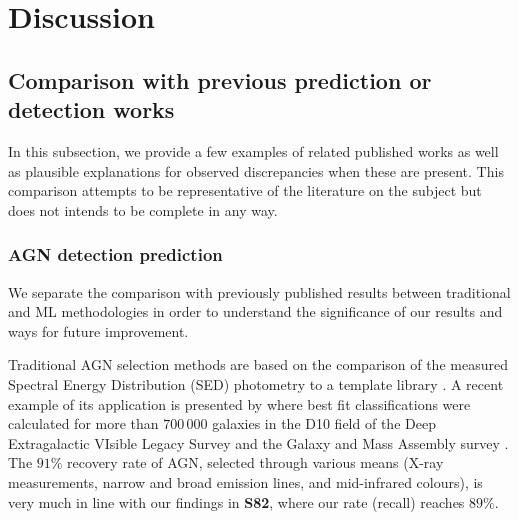 \documentclass{aa}
\begin{document}
\section{Discussion}\label{sec:discussion}


\subsection{Comparison with previous prediction or detection works}\label{sec:compare_previous_works}

In this subsection, we provide a few examples of related published works as well as plausible explanations for observed discrepancies when these are present. This comparison attempts to be representative of the literature on the subject but does not intends to be complete in any way.

\subsubsection{AGN detection prediction}\label{sec:previous_AGN_detection}

We separate the comparison with previously published results between traditional and ML methodologies in order to understand the significance of our results and ways for future improvement.

Traditional AGN selection methods are based on the comparison of the measured Spectral Energy Distribution (SED) photometry to a template library \citep{2011Ap&SS.331....1W}. A recent example of its application is presented by  \citet{2022MNRAS.509.4940T} where best fit classifications were calculated for more than $700\,000$ galaxies in the D10 field of the Deep Extragalactic VIsible Legacy Survey \citep[DEVILS;][]{2018MNRAS.480..768D} and the Galaxy and Mass Assembly survey \citep[GAMA;][]{2011MNRAS.413..971D, 2015MNRAS.452.2087L}.
The $91 \%$ recovery rate of AGN, selected through various means (X-ray measurements, narrow and broad emission lines, and mid-infrared colours), is very much in line with our findings in \textbf{S82}, where our rate (recall) reaches $89 \%$.
\end{document}
